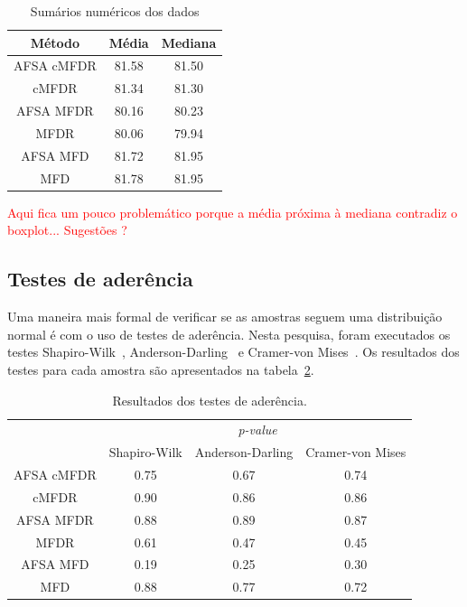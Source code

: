 \documentclass[conference]{IEEEtran}
\begin{document}
\begin{table}[h]
	\centering
	\caption{Sumários numéricos dos dados}
	\label{tab:est_descr}
	\begin{tabular}{c|cc}
		Método    	& Média  	& Mediana \\
		\hline
		AFSA cMFDR 	& 81.58 	& 81.50  \\
		cMFDR 		& 81.34 	& 81.30		 \\
		AFSA MFDR 	& 80.16 	& 80.23 	 \\
		MFDR 		& 80.06 	& 79.94 	 \\
		AFSA MFD 	& 81.72 	& 81.95 	 \\
		MFD 		& 81.78 	& 81.95 	 \\
		\hline
	\end{tabular}
\end{table}

\textcolor{red}{Aqui fica um pouco problemático porque a média próxima à mediana contradiz o boxplot... Sugestões ?}


\subsection{Testes de aderência}

Uma maneira mais formal de verificar se as amostras seguem uma distribuição normal é com o uso de testes de aderência.
Nesta pesquisa, foram executados os testes Shapiro-Wilk~\cite{shapiro1965analysis}, Anderson-Darling~\cite{anderson1954test} e Cramer-von Mises~\cite{durbin1972components}.
Os resultados dos testes para cada amostra são apresentados na tabela~\ref{tab:aderencia}.

\begin{table}[h]
	\centering
	\caption{Resultados dos testes de aderência.}
	\label{tab:aderencia}
	\begin{tabular}{c|ccc}
		\hline
		& \multicolumn{3}{c}{\textit{p-value}}      \\
		\cline{2-4}
						& Shapiro-Wilk 	& Anderson-Darling  & Cramer-von Mises\\
		\hline
		AFSA cMFDR		& 0.75       	& 0.67           	& 0.74 \\
		cMFDR 			& 0.90       	& 0.86          	& 0.86 \\
		AFSA MFDR  		& 0.88       	& 0.89          	& 0.87 \\
		MFDR  			& 0.61       	& 0.47            	& 0.45 \\
		AFSA MFD   		& 0.19       	& 0.25          	& 0.30 \\
		MFD   			& 0.88       	& 0.77          	& 0.72 \\
		\hline
	\end{tabular}
\end{table}
\end{document}
